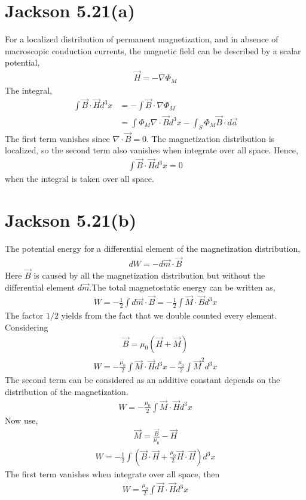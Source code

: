 \documentclass{article}
\begin{document}
\section*{Jackson 5.21(a)}

For a localized distribution of permanent magnetization, and in absence of macroscopic conduction currents, the magnetic field can be described by a scalar potential,
\begin{align*}
  \vec H=-\nabla\Phi_M
\end{align*}
The integral,
\begin{align*}
  \int\vec B\cdot\vec Hd^3x&=-\int\vec B\cdot\nabla\Phi_M\\
                           &=\int\Phi_M\nabla\cdot\vec B d^3x-\int_S\Phi_M\vec B\cdot d\vec a
\end{align*}
The first term vanishes since $\nabla\cdot\vec B=0$. The magnetization distribution is localized, so the second term also vanishes when integrate over all space. Hence,
\begin{align*}
  \int \vec B\cdot\vec Hd^3 x=0
\end{align*}
when the integral is taken over all space.
\pagebreak

\section*{Jackson 5.21(b)}

The potential energy for a differential element of the magnetization distribution,
\begin{align*}
  dW=-d\vec m\cdot\vec B
\end{align*}
Here $\vec B$ is caused by all the magnetization distribution but without the differential element $d\vec m$.The total magnetostatic energy can be written as,
\begin{align*}
  W=-\frac{1}{2}\int d\vec m\cdot\vec B=-\frac{1}{2}\int \vec M\cdot\vec B d^3x
\end{align*}
The factor $1/2$ yields from the fact that we double counted every element. Considering
\begin{align*}
  \vec B=\mu_0(\vec H+\vec M)
\end{align*}
\begin{align*}
  W=-\frac{\mu_0}{2}\int \vec M\cdot\vec H d^3x-\frac{\mu_0}{2}\int\vec M^2 d^3x
\end{align*}
The second term can be considered as an additive constant depends on the distribution of the magnetization.
\begin{align*}
  W=-\frac{\mu_0}{2}\int\vec M\cdot\vec H d^3x
\end{align*}
Now use,
\begin{align*}
  \vec M=\frac{\vec B}{\mu_0}-\vec H
\end{align*}
\begin{align*}
  W=-\frac{1}{2}\int (\vec B\cdot\vec H+\frac{\mu_0}{2}\vec H\cdot \vec H) d^3x
\end{align*}
The first term vanishes when integrate over all space, then
\begin{align*}
  W=\frac{\mu_0}{2}\int\vec H\cdot\vec H d^3x
\end{align*}
\pagebreak
\end{document}

